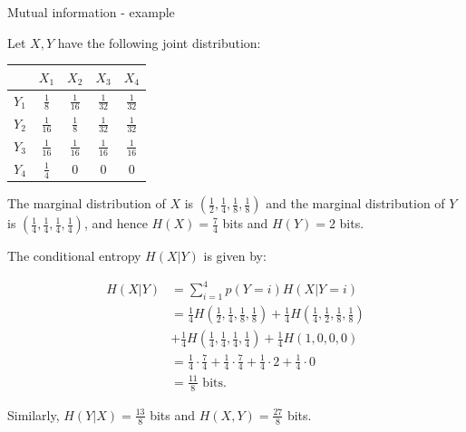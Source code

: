 \documentclass[11pt,compress,t,notes=noshow, xcolor=table]{beamer}
\begin{document}
\begin{vbframe} {Mutual information - example}

Let $X, Y$ have the following joint distribution:

\begin{table}[]
  \begin{tabular}{c|c|c|c|c|}
    & $X_1$ & $X_2$ & $X_3$ & $X_4$ \\ 
    \hline
    $Y_1$ & $\frac{1}{8}$ & $\frac{1}{16}$ & $\frac{1}{32}$ & $\frac{1}{32}$ \\
    \hline
    $Y_2$ & $\frac{1}{16}$ & $\frac{1}{8}$ & $\frac{1}{32}$ & $\frac{1}{32}$ \\
    \hline
    $Y_3$ & $\frac{1}{16}$ & $\frac{1}{16}$ & $\frac{1}{16}$ & $\frac{1}{16}$ \\
    \hline
    $Y_4$ & $\frac{1}{4}$ & 0 & 0 & 0 \\
    \hline
  \end{tabular}
\end{table}

\lz

The marginal distribution of $X$ is $(\frac{1}{2}, \frac{1}{4}, \frac{1}{8}, \frac{1}{8})$ and the marginal distribution of $Y$ is $(\frac{1}{4}, \frac{1}{4}, \frac{1}{4}, \frac{1}{4})$, and hence $H(X) = \frac{7}{4}$ bits and $H(Y) = 2$ bits.

\framebreak

The conditional entropy $H(X|Y)$ is given by:

\begin{equation*}
  \begin{aligned}
    H(X|Y) &= \sum_{i = 1}^4 p(Y = i) H(X | Y = i) \\
    &= \frac{1}{4} H \left( \frac{1}{2}, \frac{1}{4}, \frac{1}{8}, \frac{1}{8} \right) +     \frac{1}{4} H \left( \frac{1}{4}, \frac{1}{2}, \frac{1}{8}, \frac{1}{8} \right) \\
    &+ \frac{1}{4} H \left( \frac{1}{4}, \frac{1}{4}, \frac{1}{4}, \frac{1}{4} \right) +     \frac{1}{4} H \left(1,0,0,0 \right) \\
    &=  \frac{1}{4} \cdot \frac{7}{4} + \frac{1}{4} \cdot \frac{7}{4} + \frac{1}{4} \cdot     2 + \frac{1}{4} \cdot 0 \\
    &= \frac{11}{8} \text{ bits}.
  \end{aligned}
\end{equation*}

Similarly, $H(Y|X) = \frac{13}{8}$ bits and $H(X,Y) = \frac{27}{8}$ bits.

\end{vbframe}
\end{document}
